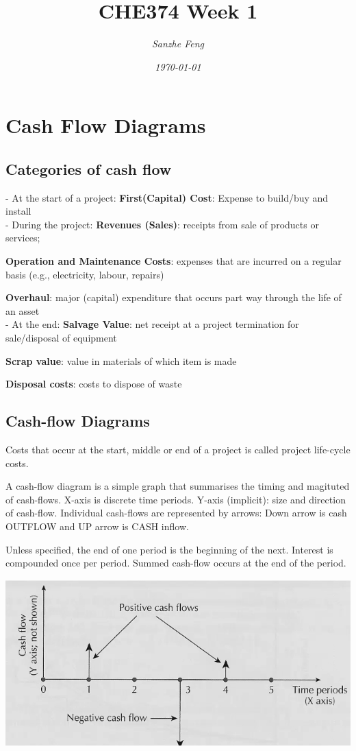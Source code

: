 \documentclass{article}
\begin{document}
\begin{titlepage}
\title{\textbf{CHE374 Week 1}}
\author{\textit{Sanzhe Feng}}
\date{\textit{\today}}
\maketitle
\end{titlepage}
\setlength{\parindent}{0pt}

\section*{Cash Flow Diagrams}
\subsection*{Categories of cash flow}
- At the start of a project: \textbf{First(Capital) Cost}: Expense to build/buy and install\\

- During the project: \textbf{Revenues (Sales)}: receipts from sale of products or services; 

\textbf{Operation and Maintenance Costs}: expenses that are incurred on a regular basis (e.g., electricity, labour, repairs)

\textbf{Overhaul}: major (capital) expenditure that occurs part way through the life of an asset\\

- At the end: \textbf{Salvage Value}: net receipt at a project termination for sale/disposal of equipment

\textbf{Scrap value}: value in materials of which item is made

\textbf{Disposal costs}: costs to dispose of waste

\subsection*{Cash-flow Diagrams}
Costs that occur at the start, middle or end of a project is called project life-cycle costs.

A cash-flow diagram is a simple graph that summarises the timing and magituted of cash-flows. X-axis is discrete time periods. Y-axis (implicit): size and direction of cash-flow.
Individual cash-flows are represented by arrows: Down arrow is cash OUTFLOW and UP arrow is CASH inflow.

Unless specified, the end of one period is the beginning of the next. Interest is compounded once per period. Summed cash-flow occurs at the end of the period.
\begin{center}
\includegraphics[width=0.5\linewidth]{W2V1.png}
\end{center}
\end{document}
